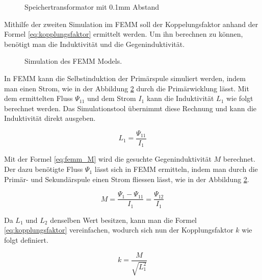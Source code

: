 \begin{figure}[h]
	\centering
	\qquad
	\caption{Speichertransformator mit 0.1mm Abstand}
	\label{fig:saettigung}
\end{figure}
\newpage

Mithilfe der zweiten Simulation im FEMM soll der Koppelungsfaktor anhand der Formel \ref{eq:kopplungsfaktor} ermittelt werden. Um ihn berechnen zu können, benötigt man die Induktivität und die Gegeninduktivität.

\begin{figure}[H]
	\centering
	\qquad
	\caption{Simulation des FEMM Models.}
	\label{fig:femmkopplung}
\end{figure}

In FEMM kann die Selbstinduktion der Primärspule simuliert werden, indem man einen Strom, wie in der Abbildung \ref{fig:femmkopplung} durch die Primärwicklung lässt. Mit dem ermittelten Fluss $ \Psi_{11}  $ und dem Strom $ I_{1} $ kann die Induktivität $ L_{1} $ wie folgt berechnet werden. Das Simulationstool übernimmt diese Rechnung und kann die Induktivität direkt ausgeben. \cite{femm}

\begin{equation}
L_{1}=\frac{\Psi_{11}}{I_{1}}
\label{eq:femm_l1}
\end{equation}

Mit der Formel \ref{eq:femm_M} wird die gesuchte Gegeninduktivität $ M $ berechnet.
Der dazu benötigte Fluss $ \Psi_{1} $ lässt sich in FEMM ermitteln, indem man durch die Primär- und Sekundärspule einen Strom fliessen lässt, wie in der Abbildung \ref{fig:femmkopplung}. \cite{femm}

\begin{equation}
M=\frac{\Psi_{1}-\Psi_{11}}{I_{1}}=\frac{\Psi_{12}}{I_{1}}
\label{eq:femm_M}
\end{equation}

Da $ L_{1} $ und $ L_{2} $ denselben Wert besitzen, kann man die Formel \ref{eq:kopplungsfaktor} vereinfachen, wodurch sich nun der Kopplungsfaktor $ k $ wie folgt definiert.

\begin{equation}
k=\frac{M}{\sqrt{L_{1}^{2}}}
\label{eq:kopplungsfaktor_neu}
\end{equation}

